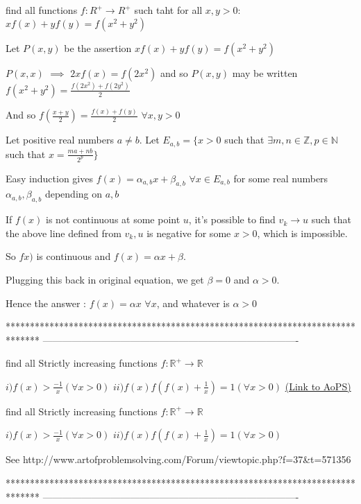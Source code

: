 \begin{solution}
	\begin{tcolorbox}find all functions $f:R^+ \rightarrow R^+$ such taht for all $x,y>0$:
$xf(x)+yf(y)=f(x^2+y^2)$\end{tcolorbox}
Let $P(x,y)$ be the assertion $xf(x)+yf(y)=f(x^2+y^2)$

$P(x,x)$ $\implies$ $2xf(x)=f(2x^2)$ and so $P(x,y)$ may be  written $f(x^2+y^2)=\frac{f(2x^2)+f(2y^2)}2$

And so $f(\frac{x+y}2)=\frac{f(x)+f(y)}2$ $\forall x,y>0$

Let positive real numbers $a\ne b$. Let $E_{a,b}=\{x>0$ such that $\exists m,n\in\mathbb Z,p\in\mathbb N$ such that $x=\frac{ma+nb}{2^p}\}$

Easy induction gives $f(x)=\alpha_{a,b}x+\beta_{a,b}$ $\forall x\in E_{a,b}$ for some real numbers $\alpha_{a,b},\beta_{a,b}$ depending on $a,b$

If $f(x)$ is not continuous at some point $u$, it's possible to find $v_k\to u$ such that the above line defined  from $v_k, u$ is negative for some $x>0$, which is impossible.

So $fx)$ is continuous and $f(x)=\alpha x+\beta$. 

Plugging this back in original equation, we get $\beta=0$ and $\alpha >0$.

Hence the answer : $\boxed{f(x)=\alpha x}$ $\forall x$, and whatever is $\alpha >0$
\end{solution}
*******************************************************************************
-------------------------------------------------------------------------------

\begin{problem}
	find all Strictly increasing functions $f:\mathbb{R}^{+}\rightarrow \mathbb{R}$ 

$i) f(x)> \frac{-1}{x} (\forall x> 0)$ 
$ii) f(x)f(f(x)+\frac{1}{x}) =1 (\forall x> 0)$
	\flushright \href{https://artofproblemsolving.com/community/c6h572661}{(Link to AoPS)}
\end{problem}



\begin{solution}
	\begin{tcolorbox}find all Strictly increasing functions $f:\mathbb{R}^{+}\rightarrow \mathbb{R}$ 

$i) f(x)> \frac{-1}{x} (\forall x> 0)$ 
$ii) f(x)f(f(x)+\frac{1}{x}) =1 (\forall x> 0)$\end{tcolorbox}
See http://www.artofproblemsolving.com/Forum/viewtopic.php?f=37&t=571356
\end{solution}
*******************************************************************************
-------------------------------------------------------------------------------

